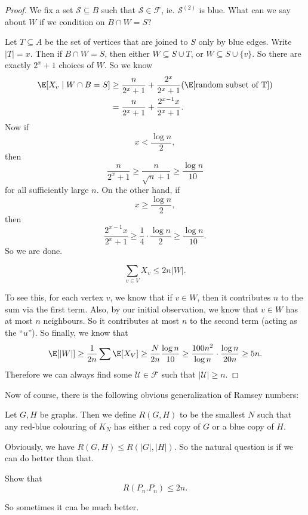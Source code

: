 \documentclass[a4paper]{article}
\begin{document}
\begin{proof}
  We fix a set $\mathcal{S} \subseteq B$ such that $\mathcal{S} \in \mathcal{F}$, ie. $\mathcal{S}^{(2)}$ is blue. What can we say about $W$ if we condition on $B \cap W = S$?

  Let $T \subseteq A$ be the set of vertices that are joined to $S$ only by blue edges. Write $|T| = x$. Then if $B \cap W = S$, then either $W \subseteq S \cup T$, or $W \subseteq S \cup \{v\}$. So there are exactly $2^x + 1$ choices of $W$. So we know
  \begin{align*}
    \E[X_v \mid W \cap B = S] &\geq \frac{n}{2^x + 1} + \frac{2^x}{2^x + 1}(\E[\text{random subset of T}])\\
    &= \frac{n}{2^x + 1} + \frac{2^{x - 1}x}{2^x + 1}.
  \end{align*}
  Now if
  \[
    x < \frac{\log n}{2},
  \]
  then
  \[
    \frac{n}{2^x + 1} \geq \frac{n}{\sqrt{n} + 1} \geq \frac{\log n}{10}
  \]
  for all sufficiently large $n$. On the other hand, if
  \[
    x \geq \frac{\log n}{2},
  \]
  then
  \[
    \frac{2^{x - 1}x}{2^x + 1} \geq \frac{1}{4} \cdot \frac{\log n}{2} \geq \frac{\log n}{10}.
  \]
  So we are done.

  \begin{claim}
    \[
      \sum_{v \in V} X_v \leq 2n |W|.
    \]
  \end{claim}
  To see this, for each vertex $v$, we know that if $v \in W$, then it contributes $n$ to the sum via the first term. Also, by our initial observation, we know that $v \in W$ has at most $n$ neighbours. So it contributes at most $n$ to the second term (acting as the ``$u$''). So finally, we know that
  \[
    \E[|W|] \geq \frac{1}{2n} \sum \E[X_V] \geq \frac{N}{2n} \frac{\log n}{10} \geq \frac{100n^2}{\log n} \cdot \frac{\log n}{20 n} \geq 5n.
  \]
  Therefore we can always find some $\mathcal{U} \in \mathcal{F}$ such that $|\mathcal{U}| \geq n$.
\end{proof}

Now of course, there is the following obvious generalization of Ramsey numbers:
\begin{defi}[$R(G, H)$]
  Let $G, H$ be graphs. Then we define $R(G, H)$ to be the smallest $N$ such that any red-blue colouring of $K_N$ has either a red copy of $G$ or a blue copy of $H$.
\end{defi}
Obviously, we have $R(G, H) \leq R(|G|, |H|)$. So the natural question is if we can do better than that.

\begin{ex}
  Show that
  \[
    R(P_n. P_n) \leq 2n.
  \]
\end{ex}
So sometimes it cna be much better.
\end{document}
